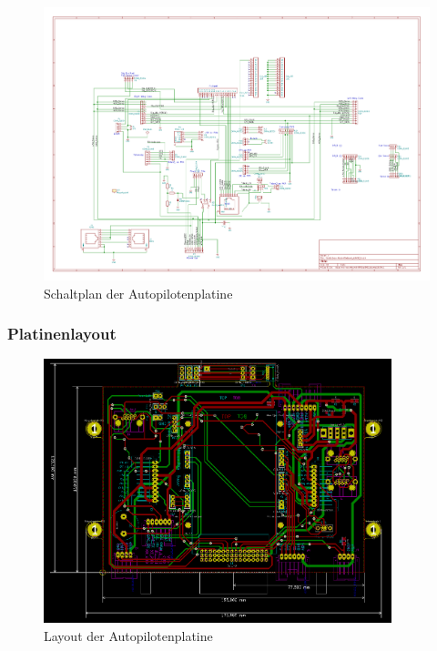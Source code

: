 \begin{figure}[H]
\centering
\includegraphics[width=1.25\textwidth,angle =90]{bilder/Centerbox/Centerbox-Rear-Pixhawk_AUVSI16.pdf} 
\caption{Schaltplan der Autopilotenplatine} 
\label{fig:Schaltplan der Autopilotenplatine}
\end{figure}

\subsubsection{Platinenlayout}

\begin{figure}[H]
\centering
\includegraphics[width=0.9\textwidth]{bilder/Centerbox/Centerbox-Rear-Pixhawk_AUVSI_2016_rev-01-layout.png} 
\caption{Layout der Autopilotenplatine} 
\label{fig:Layout der Autopilotenplatine}
\end{figure}

